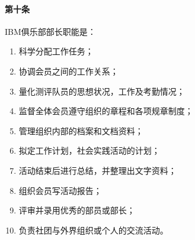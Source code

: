 \documentclass{club}
\begin{document}
\paragraph{第十条}IBM俱乐部部长职能是：
\begin{enumerate}
    \item 科学分配工作任务；
    \item 协调会员之间的工作关系；
    \item 量化测评队员的思想状况，工作及考勤情况；
    \item 监督全体会员遵守组织的章程和各项规章制度；
    \item 管理组织内部的档案和文档资料；
    \item 拟定工作计划，社会实践活动的计划；
    \item 活动结束后进行总结，并整理出文字资料；
    \item 组织会员写活动报告；
    \item 评审并录用优秀的部员或部长；
    \item 负责社团与外界组织或个人的交流活动。
\end{enumerate}
\end{document}
